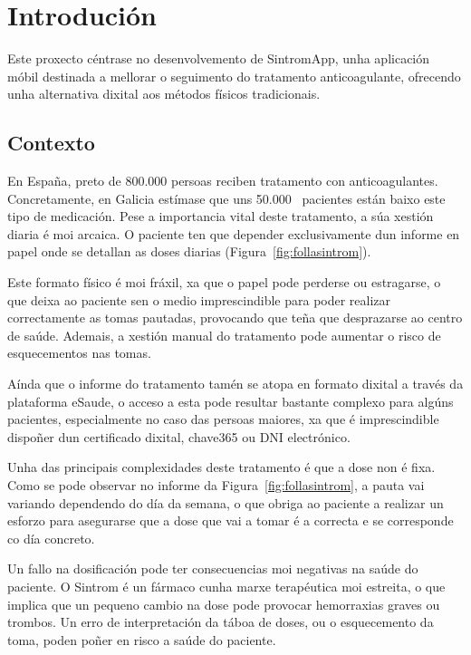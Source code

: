 \chapter{Introdución}
\label{chap:introducion}

Este proxecto céntrase no desenvolvemento de SintromApp, unha aplicación móbil destinada a mellorar o seguimento do tratamento anticoagulante, ofrecendo unha alternativa dixital aos métodos físicos tradicionais.

\section{Contexto}

En España, preto de 800.000 persoas reciben tratamento con anticoagulantes. Concretamente, en Galicia estímase que uns 50.000~\cite{PacientesAnticoaguladosAnis} pacientes están baixo este tipo de medicación. Pese a importancia vital deste tratamento, a súa xestión diaria é moi arcaica. O paciente ten que depender exclusivamente dun informe en papel onde se detallan as doses diarias (Figura~\ref{fig:follasintrom}).

Este formato físico é moi fráxil, xa que o papel pode perderse ou estragarse, o que deixa ao paciente sen o medio imprescindible para poder realizar correctamente as tomas pautadas, provocando que teña que desprazarse ao centro de saúde. Ademais, a xestión manual do tratamento pode aumentar o risco de esquecementos nas tomas.

Aínda que o informe do tratamento tamén se atopa en formato dixital a través da plataforma eSaude, o acceso a esta pode resultar bastante complexo para algúns pacientes, especialmente no caso das persoas maiores, xa que é imprescindible dispoñer dun certificado dixital, chave365 ou DNI electrónico.

Unha das principais complexidades deste tratamento é que a dose non é fixa. Como se pode observar no informe da Figura~\ref{fig:follasintrom}, a pauta vai variando dependendo do día da semana, o que obriga ao paciente a realizar un esforzo para asegurarse que a dose que vai a tomar é a correcta e se corresponde co día concreto.

Un fallo na dosificación pode ter consecuencias moi negativas na saúde do paciente. O Sintrom é un fármaco cunha marxe terapéutica moi estreita, o que implica que un pequeno cambio na dose pode provocar hemorraxias graves ou trombos. Un erro de interpretación da táboa de doses, ou o esquecemento da toma, poden poñer en risco a saúde do paciente.

